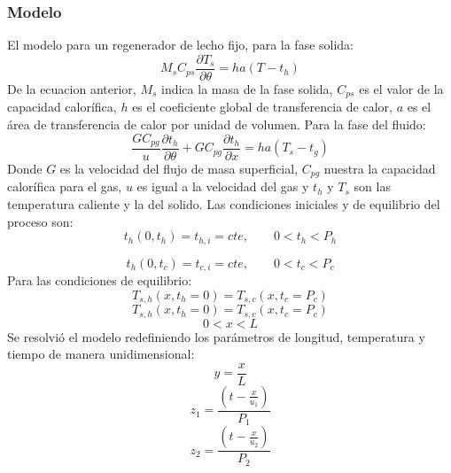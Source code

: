 \documentclass[12pt,letterpaper,final]{article}%
\begin{document}
\subsubsection*{Modelo}
El modelo para un regenerador de lecho fijo, para la fase solida:
\begin{equation}
	M_s C_{ps}\frac{\partial T_s}{\partial \theta} = h a (T - t_h)
\end{equation}
De la ecuacion anterior, $M_s$ indica la masa de la fase solida, $C_{ps}$ es el valor de la capacidad calorífica, $h$ es el coeficiente global de transferencia de calor, $a$ es el área de transferencia de calor por unidad de volumen.  
\newline
Para la fase del fluido:
\begin{equation}
	\frac{G C_{pg}}{u}\frac{\partial t_h}{\partial \theta} + G C_{pg}\frac{\partial t_h}{\partial x} = ha(T_s - t_g)
\end{equation}
Donde $G$ es la velocidad del flujo de masa superficial, $C_{pg}$ nuestra la capacidad calorífica para el gas, $u$ es igual a la velocidad del gas y $t_h$ y $T_s$ son las temperatura caliente y la del solido.
\newline
Las condiciones iniciales y de equilibrio del proceso son:
\begin{equation*}
	t_h(0,t_h) = t_{h,i} = cte , \qquad 0<t_h<P_h
\end{equation*}

\begin{equation*}
	t_h(0,t_c) = t_{c,i} = cte , \qquad 0<t_c<P_c
\end{equation*}
Para las condiciones de equilibrio:
\begin{equation*}
	T_{s,h}(x,t_h=0) = T_{s,c}(x,t_c=P_c)
\end{equation*}
\begin{equation*}
	T_{s,h}(x,t_h=0) = T_{s,c}(x,t_c=P_c)
\end{equation*}
\begin{equation*}
	0<x<L
\end{equation*}
Se resolvió el modelo redefiniendo los parámetros de longitud, temperatura y tiempo de manera unidimensional:
\begin{equation*}
	y = \frac{x}{L}
\end{equation*}
\begin{equation*}
	z_1 = \frac{(t-\frac{x}{u_1})}{P_1}
\end{equation*}
\begin{equation*}
	z_2 = \frac{(t-\frac{x}{u_2})}{P_2}
\end{equation*}
\end{document}
